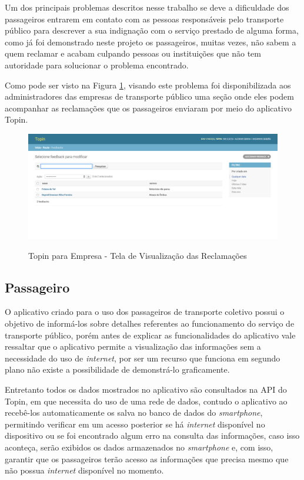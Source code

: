{{{{{{{Um dos principais problemas descritos nesse trabalho se deve a dificuldade dos passageiros entrarem em contato com as pessoas
responsáveis pelo transporte público para descrever a sua indignação com o serviço prestado de alguma forma, como já foi
demonstrado neste projeto os passageiros, muitas vezes, não sabem a quem reclamar e acabam culpando pessoas ou instituições
que não tem autoridade para solucionar o problema encontrado.

Como pode ser visto na Figura \ref{fig:empresa-visualizar-reclamacao}, visando este problema foi disponibilizada aos
administradores das empresas de transporte público uma seção onde eles podem acompanhar as reclamações que os passageiros
enviaram por meio do aplicativo Topin.

\begin{figure}[H]
\caption{Topin para Empresa - Tela de Visualização das Reclamações}
\centering
\includegraphics[width=1.0\textwidth]{imagens/visualizar-reclamacao.png}
\label{fig:empresa-visualizar-reclamacao}
\end{figure}

\subsection{Passageiro}

O aplicativo criado para o uso dos passageiros de transporte coletivo possui o objetivo de informá-los sobre detalhes referentes
ao funcionamento do serviço de transporte público, porém antes de explicar as funcionalidades do aplicativo vale ressaltar
que o aplicativo permite a visualização das informações sem a necessidade do uso de \textit{internet}, por ser um recurso que funciona em
segundo plano não existe a possibilidade de demonstrá-lo graficamente.

Entretanto todos os dados mostrados no aplicativo são consultados na API do Topin, em que necessita do uso de uma rede de dados,
contudo o aplicativo ao recebê-los automaticamente os salva no banco de dados do \textit{smartphone}, permitindo verificar em um
acesso posterior se há \textit{internet} disponível no dispositivo ou se foi encontrado algum erro na consulta das informações, caso isso
aconteça, serão exibidos os dados armazenados no \textit{smartphone} e, com isso, garantir que os passageiros terão acesso as
informações que precisa mesmo que não possua \textit{internet} disponível no momento.

}}}}}}}
